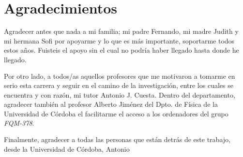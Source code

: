 
\pagestyle{fancy} 

\chapter*{Agradecimientos}

Agradecer antes que nada a mi familia; mi padre Fernando, mi madre Judith y mi hermana Sofi por apoyarme y lo que es más importante, soportarme todos estos años. Fuisteis el apoyo sin el cual no podría haber llegado hasta donde he llegado.

Por otro lado, a todos/as aquellos profesores que me motivaron a tomarme en serio esta carrera y seguir en el camino de la investigación, entre los cuales se encuentra y con razón, mi tutor Antonio J. Cuesta. Dentro del departamento, agradecer también al profesor Alberto Jiménez del Dpto. de Física de la Universidad de Córdoba el facilitarme el acceso a los ordenadores del grupo \textit{FQM-378}.

Finalmente, agradecer a todas las personas que están detrás de este trabajo, desde la Universidad de Córdoba, Antonio 
